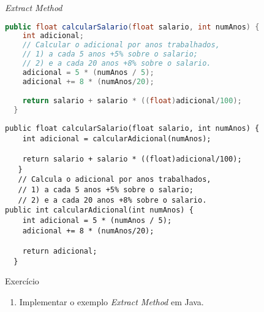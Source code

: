 \begin{frame}[fragile]{\em Extract Method}
\begin{lstlisting}[language=java]
  public float calcularSalario(float salario, int numAnos) {
    int adicional;
    // Calcular o adicional por anos trabalhados,
    // 1) a cada 5 anos +5% sobre o salario;
    // 2) e a cada 20 anos +8% sobre o salario.
    adicional = 5 * (numAnos / 5);
    adicional += 8 * (numAnos/20);

    return salario + salario * ((float)adicional/100);
  }
\end{lstlisting}

\pause

\begin{lstlisting}[basicstyle=\tiny\color{red}]
  public float calcularSalario(float salario, int numAnos) {
    int adicional = calcularAdicional(numAnos);
    
    return salario + salario * ((float)adicional/100);
   }
   // Calcula o adicional por anos trabalhados,
   // 1) a cada 5 anos +5% sobre o salario;
   // 2) e a cada 20 anos +8% sobre o salario.
public int calcularAdicional(int numAnos) {
    int adicional = 5 * (numAnos / 5);
    adicional += 8 * (numAnos/20);
    
    return adicional;
  }
\end{lstlisting}
\end{frame}

\begin{frame}{Exercício}
  \begin{enumerate}
  \item Implementar o exemplo \emph{Extract Method} em Java.
  \end{enumerate}
\end{frame}

